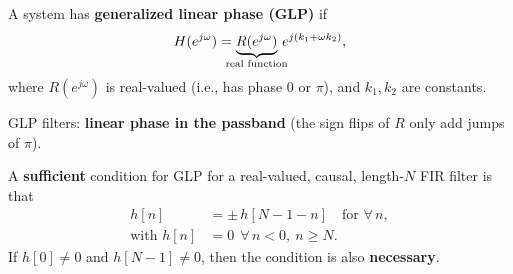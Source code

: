\documentclass[handout_subfiles_root.tex]{subfiles}
\begin{document}

\begin{defbox}[title={Def}]
A system has \textbf{generalized linear phase (GLP)} if
\begin{equation*}
H(e^{j\omega}) = \underbrace{R(e^{j\omega})}_{\HandoutUnderbraceLabel{\text{real function}}}\,e^{j(k_1+\omega k_2)},
\end{equation*}
where $R(e^{j\omega})$ is real-valued (i.e., has phase $0$ or $\pi$), and $k_1,k_2$ are constants.
\end{defbox}

\noindent GLP filters: \textbf{linear phase in the passband} (the sign flips of $R$ only add jumps of $\pi$).

\begin{factbox}[title={Property}]
A \textbf{sufficient} condition for GLP for a real-valued, causal, length-$N$ FIR filter is that
\begin{align*}
h[n] &= \pm\,h[N-1-n] \quad \text{for }\forall\, n, \\
\text{with } h[n] &= 0 \ \ \forall\, n<0,\ n\ge N.
\end{align*}
If $h[0]\ne 0$ and $h[N-1]\ne 0$, then the condition is also \textbf{necessary}.
\end{factbox}
\end{document}

